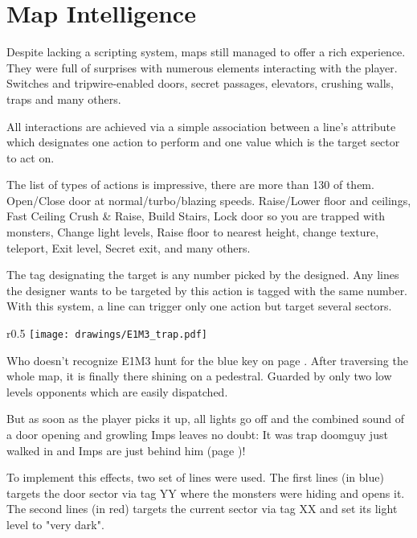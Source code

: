 \section{Map Intelligence}
Despite lacking a scripting system, maps still managed to offer a rich experience. They were full of surprises with numerous elements interacting with the player. Switches and tripwire-enabled doors, secret passages, elevators, crushing walls, traps and many others.\\
\par
{}
\par
All interactions are achieved via a simple association between a line's  attribute which designates one action to perform and one  value which is the target sector to act on.\\
\par
The list of types of actions is impressive, there are more than 130 of them. Open/Close door at normal/turbo/blazing speeds. Raise/Lower floor and ceilings, Fast Ceiling Crush \& Raise, Build Stairs, Lock door so you are trapped with monsters, Change light levels, Raise floor to nearest height, change texture, teleport, Exit level, Secret exit, and many others.\\
\par
The tag designating the target is any number picked by the designed. Any lines the designer wants to be targeted by this action is tagged with the same number. With this system, a line can trigger only one action but target several sectors.\\
\par
{}
\pagebreak






\begin{wrapfigure}[17]{r}{0.5\textwidth}
\centering
\texttt{[image: drawings/E1M3\_trap.pdf]}
\end{wrapfigure}
Who doesn't recognize E1M3 hunt for the blue key on page \pageref{e1m3_trap}. After traversing the whole map, it is finally there shining on a pedestral. Guarded by only two low levels opponents which are easily dispatched.\\
\par
But as soon as the player picks it up, all lights go off and the combined sound of a door opening and growling Imps leaves no doubt: It was trap doomguy just walked in and Imps are just behind him (page \pageref{e1m3_trap})!\\
\par
To implement this effects, two set of lines were used. The first lines (in blue) targets the door sector via tag YY where the monsters were hiding and opens it. The second lines (in red) targets the current sector via tag XX and set its light level to "very dark".\\
\par



